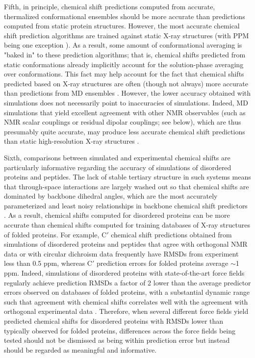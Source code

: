 \documentclass[9pt,review,pubversion]{livecoms}
\begin{document}
Fifth, in principle, chemical shift predictions computed from accurate, thermalized conformational ensembles should be more accurate than predictions computed from static protein structures.
However, the most accurate chemical shift prediction algorithms are trained against static X-ray structures (with PPM being one exception \cite{li_ppm_2012}).
As a result, some amount of conformational averaging is "baked in" to these prediction algorithms; that is, chemical shifts predicted from static conformations already implicitly account for the solution-phase averaging over conformations.
This fact may help account for the fact that chemical shifts predicted based on X-ray structures are often (though not always) more accurate than predictions from MD ensembles \cite{li_certification_2010,markwick_enhanced_2010,robustelli_interpreting_2012,robustelli_conformational_2013}.
However, the lower accuracy obtained with simulations does not necessarily point to inaccuracies of simulations.
Indeed, MD simulations that yield excellent agreement with other NMR observables (such as NMR scalar couplings or residual dipolar couplings; see below), which are thus presumably quite accurate, may produce less accurate chemical shift predictions than static high-resolution X-ray structures \cite{li_certification_2010,robustelli_interpreting_2012,robustelli_developing_2018}.

Sixth, comparisons between simulated and experimental chemical shifts are particularly informative regarding the accuracy of simulations of disordered proteins and peptides.
The lack of stable tertiary structure in such systems means that through-space interactions are largely washed out so that chemical shifts are dominated by backbone dihedral angles, which are the most accurately parameterized and least noisy relationships in backbone chemical shift predictors \cite{salmon_nmr_2010}.
As a result, chemical shifts computed for disordered proteins can be more accurate than chemical shifts computed for training databases of X-ray structures of folded proteins.
For example, C$'$ chemical shift predictions obtained from simulations of disordered proteins and peptides that agree with orthogonal NMR data or with circular dichroism data frequently have RMSDs from experiment less than 0.5 ppm, whereas C$'$ prediction errors for folded proteins average $\sim$1 ppm.
Indeed, simulations of disordered proteins with state-of-the-art force fields regularly achieve prediction RMSDs a factor of 2 lower than the average predictor errors observed on databases of folded proteins, with a substantial dynamic range such that agreement with chemical shifts correlates well with the agreement with orthogonal experimental data \cite{salmon_nmr_2010,robustelli_conformational_2013,schwalbe_predictive_2014,robustelli_developing_2018}.
Therefore, when several different force fields yield predicted chemical shifts for disordered proteins with RMSDs lower than typically observed for folded proteins, differences across the force fields being tested should not be dismissed as being within prediction error but instead should be regarded as meaningful and informative.
\end{document}

